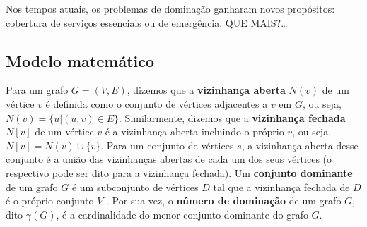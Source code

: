 \documentclass[11pt]{article}
\begin{document}
Nos tempos atuais, os problemas de dominação ganharam novos propósitos: cobertura de serviços essenciais ou de emergência, QUE MAIS?\ldots{}

\subsection{Modelo matemático}
\label{sec:orgbeb842e}
Para um grafo \(G = (V, E)\), dizemos que a \textbf{vizinhança aberta} \(N(v)\) de um vértice \(v\) é definida como o conjunto de vértices adjacentes a \(v\) em \(G\), ou seja, \(N(v) = \{u|(u, v) \in E\}\).
Similarmente, dizemos que a \textbf{vizinhança fechada} \(N[v]\) de um vértice \(v\) é a vizinhança aberta incluindo o próprio \(v\), ou seja, \(N[v] = N(v) \cup \{v\}\).
Para um conjunto de vértices \(s\), a vizinhança aberta desse conjunto é a união das vizinhanças abertas de cada um dos seus vértices (o respectivo pode ser dito para a vizinhança fechada).
Um \textbf{conjunto dominante} de um grafo \(G\) é um subconjunto de vértices \(D\) tal que a vizinhança fechada de \(D\) é o próprio conjunto \(V\) .
Por sua vez, o \textbf{número de dominação} de um grafo \(G\), dito \(\gamma(G)\), é a cardinalidade do menor conjunto dominante do grafo \(G\).
\end{document}
